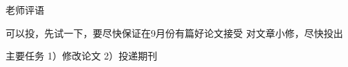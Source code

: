 \documentclass{beamer}
\begin{document}
\begin{frame}{老师评语}
\begin{alertblock}{可以投，先试一下，要尽快保证在9月份有篇好论文接受}
    对文章小修，尽快投出
\end{alertblock}

  \begin{block}{主要任务}
    1）修改论文 2）投递期刊 
  \end{block}
\end{frame}

%   
%   
\end{document}
